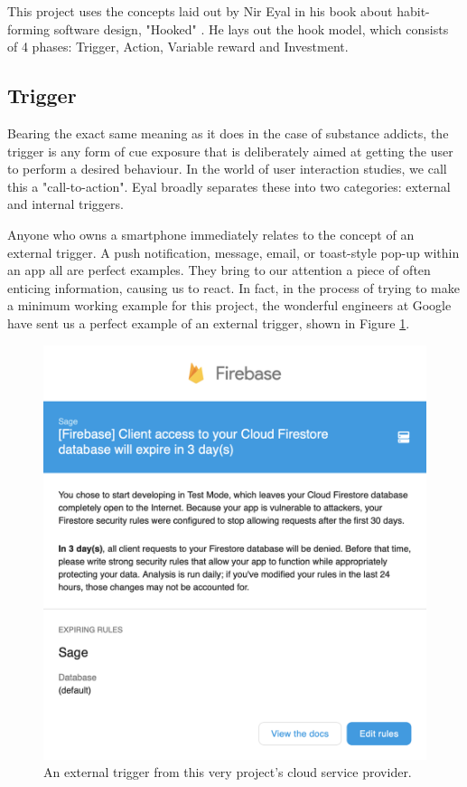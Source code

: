 This project uses the concepts laid out by Nir Eyal in his book about habit-forming software design, "Hooked" \cite{eyal2014hooked}. He lays out the hook model, which consists of 4 phases: Trigger, Action, Variable reward and Investment.

\subsection{Trigger}
Bearing the exact same meaning as it does in the case of substance addicts, the trigger is any form of cue exposure that is deliberately aimed at getting the user to perform a desired behaviour. In the world of user interaction studies, we call this a "call-to-action".  Eyal broadly separates these into two categories: external and internal triggers.

Anyone who owns a smartphone immediately relates to the concept of an external trigger. A push notification, message, email, or toast-style pop-up within an app all are perfect examples. They bring to our attention a piece of often enticing information, causing us to react. In fact, in the process of trying to make a minimum working example for this project, the wonderful engineers at Google have sent us a perfect example of an external trigger, shown in Figure \ref{fig:firebase_cue}.

\begin{figure}[h]
    \begin{center}
        \includegraphics[scale=0.3]{images/firebase_cue.png}
    \end{center}
    \caption{An external trigger from this very project's cloud service provider.}
    \label{fig:firebase_cue}
\end{figure}

